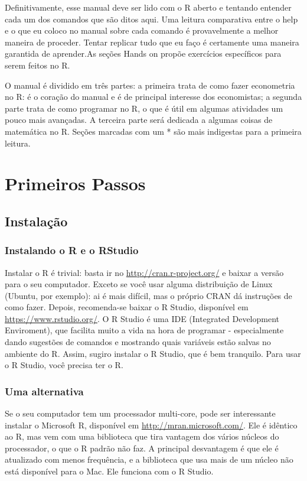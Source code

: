 \documentclass[]{book}
\begin{document}
Definitivamente, esse manual deve ser lido com o R aberto e tentando
entender cada um dos comandos que são ditos aqui. Uma leitura
comparativa entre o help e o que eu coloco no manual sobre cada comando
é provavelmente a melhor maneira de proceder. Tentar replicar tudo que
eu faço é certamente uma maneira garantida de aprender.As seções Hands
on propõe exercícios específicos para serem feitos no R.

O manual é dividido em três partes: a primeira trata de como fazer
econometria no R: é o coração do manual e é de principal interesse dos
economistas; a segunda parte trata de como programar no R, o que é útil
em algumas atividades um pouco mais avançadas. A terceira parte será
dedicada a algumas coisas de matemática no R. Seções marcadas com um *
são mais indigestas para a primeira leitura.

\chapter{Primeiros Passos}\label{primeiros-passos}

\section{Instalação}\label{instalacao}

\subsection{Instalando o R e o
RStudio}\label{instalando-o-r-e-o-rstudio}

Instalar o R é trivial: basta ir no \url{http://cran.r-project.org/} e
baixar a versão para o seu computador. Exceto se você usar alguma
distribuição de Linux (Ubuntu, por exemplo): ai é mais difícil, mas o
próprio CRAN dá instruções de como fazer. Depois, recomenda-se baixar o
R Studio, disponível em \url{https://www.rstudio.org/}. O R Studio é uma
IDE (Integrated Development Enviroment), que facilita muito a vida na
hora de programar - especialmente dando sugestões de comandos e
mostrando quais variáveis estão salvas no ambiente do R. Assim, sugiro
instalar o R Studio, que é bem tranquilo. Para usar o R Studio, você
precisa ter o R.

\subsection{Uma alternativa}\label{uma-alternativa}

Se o seu computador tem um processador multi-core, pode ser interessante
instalar o Microsoft R, disponível em \url{http://mran.microsoft.com/}.
Ele é idêntico ao R, mas vem com uma biblioteca que tira vantagem dos
vários núcleos do processador, o que o R padrão não faz. A principal
desvantagem é que ele é atualizado com menos frequência, e a biblioteca
que usa mais de um núcleo não está disponível para o Mac. Ele funciona
com o R Studio.
\end{document}
